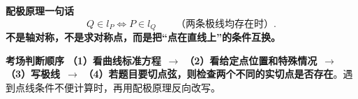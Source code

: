 \begin{summarybox}
\medskip
\textbf{\textcolor{CSummary}{配极原理一句话}}
\[
\boxed{Q\in l_P\iff P\in l_Q}\qquad\text{（两条极线均存在时）}.
\]
\textbf{不是轴对称，不是求对称点，而是把“点在直线上”的条件互换。}

\medskip
\textbf{\textcolor{CSummary}{考场判断顺序}}
\textbf{（1）看曲线标准方程}\ $\longrightarrow$ \textbf{（2）看给定点位置和特殊情况}\ $\longrightarrow$ \textbf{（3）写极线}\ $\longrightarrow$ \textbf{（4）若题目要切点弦，则检查两个不同的实切点是否存在}。遇到点线条件不便计算时，再用配极原理反向改写。
\end{summarybox}

